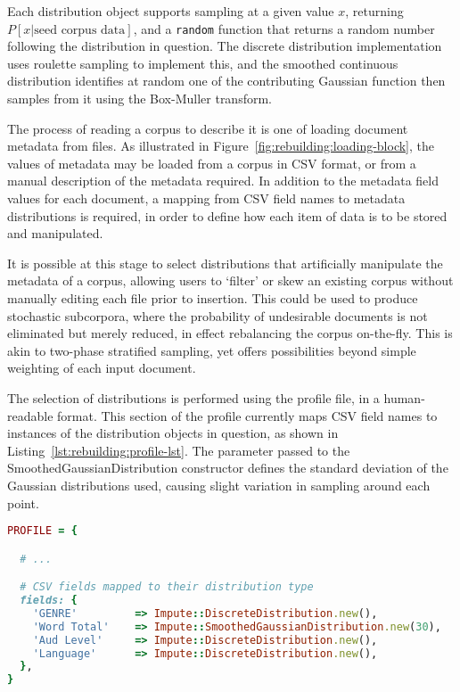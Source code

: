 Each distribution object supports sampling at a given value $x$, returning $P[x | \text{seed corpus data}]$, and a \texttt{random} function that returns a random number following the distribution in question.  The discrete distribution implementation uses roulette sampling to implement this, and the smoothed continuous distribution identifies at random one of the contributing Gaussian function then samples from it using the Box-Muller transform\cite{box1958}.

The process of reading a corpus to describe it is one of loading document metadata from files.  As illustrated in Figure~\ref{fig:rebuilding:loading-block}, the values of metadata may be loaded from a corpus in CSV format, or from a manual description of the metadata required.  In addition to the metadata field values for each document, a mapping from CSV field names to metadata distributions is required, in order to define how each item of data is to be stored and manipulated.

It is possible at this stage to select distributions that artificially manipulate the metadata of a corpus, allowing users to `filter' or skew an existing corpus without manually editing each file prior to insertion.  This could be used to produce stochastic subcorpora, where the probability of undesirable documents is not eliminated but merely reduced, in effect rebalancing the corpus on-the-fly.  This is akin to two-phase stratified sampling, yet offers possibilities beyond simple weighting of each input document.

The selection of distributions is performed using the profile file, in a human-readable format.  This section of the profile currently maps CSV field names to instances of the distribution objects in question, as shown in Listing~\ref{lst:rebuilding:profile-lst}.  The parameter passed to the SmoothedGaussianDistribution constructor defines the standard deviation of the Gaussian distributions used, causing slight variation in sampling around each point.

{\small{}
\begin{lstlisting}[language=Ruby,caption={Field mappings in the BNC corpus profile.},label=lst:rebuilding:profile-lst]
PROFILE = {

  # ...

  # CSV fields mapped to their distribution type
  fields: {
    'GENRE'         => Impute::DiscreteDistribution.new(),
    'Word Total'    => Impute::SmoothedGaussianDistribution.new(30),
    'Aud Level'     => Impute::DiscreteDistribution.new(),
    'Language'      => Impute::DiscreteDistribution.new(),
  },
}
\end{lstlisting}
}

